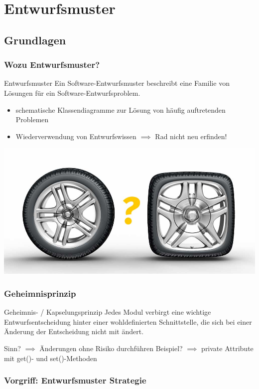 \documentclass[18pt]{beamer}
\begin{document}
\section{Entwurfsmuster}
	\subsection{Grundlagen}
	\begin{frame}
		\frametitle{Wozu Entwurfsmuster?}
		\begin{block}{Entwurfsmuster}
			Ein Software-Entwurfsmuster beschreibt eine
			Familie von Lösungen für ein Software-Entwurfsproblem.
		\end{block}
		\pause
		\begin{itemize}
			\item schematische Klassendiagramme zur Lösung von häufig auftretenden Problemen \pause
			\item Wiederverwendung von Entwurfswissen $\implies$ Rad nicht neu erfinden!
		\end{itemize}
		\pause
		\centering
		\includegraphics[scale=0.2]{./pics/tut3/new-wheel.jpg}
	\end{frame}
	
	\begin{frame}
		\frametitle{Geheimnisprinzip}
		\begin{block}{Geheimnis- / Kapselungsprinzip}
			Jedes Modul verbirgt eine wichtige
			Entwurfsentscheidung hinter einer
			wohldefinierten Schnittstelle, die sich bei einer
			Änderung der Entscheidung nicht mit ändert.
		\end{block}
		\pause
		Sinn? \pause $\implies$ Änderungen ohne Risiko durchführen \linebreak \pause
		Beispiel? \pause $\implies$ private Attribute mit get()- und set()-Methoden
	\end{frame}

	\begin{frame}
		\frametitle{Vorgriff: Entwurfsmuster Strategie}
	\end{frame}
\end{document}
